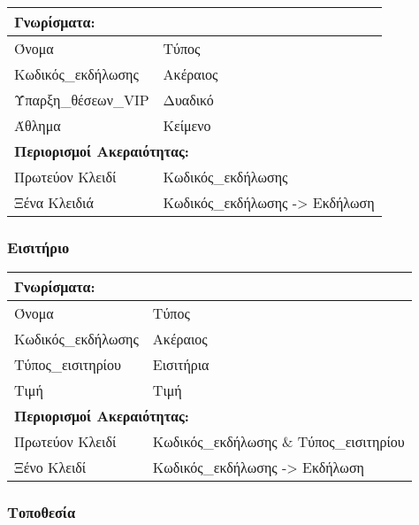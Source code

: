 \begin{tabular}{|p{6cm}|p{8cm}|}
  \multicolumn{2}{l}{\textbf{Γνωρίσματα:}}               \\ \hline
  Όνομα               & Τύπος                            \\ \hline
  Κωδικός\_εκδήλωσης  & Ακέραιος                         \\ \hline
  Ύπαρξη\_θέσεων\_VIP & Δυαδικό                          \\ \hline
  Άθλημα              & Κείμενο                          \\ \hline
  \multicolumn{2}{l}{\textbf{Περιορισμοί Ακεραιότητας:}} \\ \hline
  Πρωτεύον Κλειδί     & Κωδικός\_εκδήλωσης               \\ \hline
  Ξένα Κλειδιά        & Κωδικός\_εκδήλωσης -> Εκδήλωση   \\ \hline
\end{tabular}

\subsubsection*{Εισιτήριο}

\begin{tabular}{|p{6cm}|p{8cm}|}
  \multicolumn{2}{l}{\textbf{Γνωρίσματα:}}                     \\ \hline
  Όνομα              & Τύπος                                   \\ \hline
  Κωδικός\_εκδήλωσης & Ακέραιος                                \\ \hline
  Τύπος\_εισιτηρίου  & Εισιτήρια                               \\ \hline
  Τιμή               & Τιμή                                    \\ \hline
  \multicolumn{2}{l}{\textbf{Περιορισμοί Ακεραιότητας:}}       \\ \hline
  Πρωτεύον Κλειδί    & Κωδικός\_εκδήλωσης \& Τύπος\_εισιτηρίου \\ \hline
  Ξένο Κλειδί        & Κωδικός\_εκδήλωσης -> Εκδήλωση          \\ \hline
\end{tabular}


\subsubsection*{Τοποθεσία}

